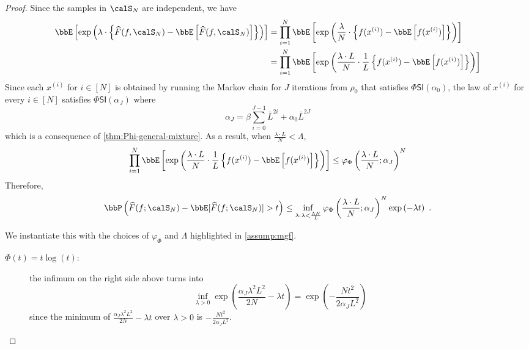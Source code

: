 \documentclass[11pt]{article}
\newcommand{\PhiSI}[1]{\Phi\mathsf{SI}\left(#1\right)}
\begin{document}
\begin{proof}
Since the samples in \(\calS_{N}\) are independent, we have
\begin{align*}
    \bbE\left[\exp\left(\lambda \cdot \left\{\widehat{F}(f, \calS_{N}) - \bbE\left[\widehat{F}(f, \calS_{N})\right]\right\}\right)\right] &= \prod_{i=1}^{N} \bbE\left[\exp\left(\frac{\lambda}{N} \cdot \left\{ f(x^{(i)}) - \bbE\left[f(x^{(i)})\right]\right\}\right)\right] \\
    &= \prod_{i=1}^{N} \bbE\left[\exp\left(\frac{\lambda \cdot L}{N} \cdot \frac{1}{L}\left\{ f(x^{(i)}) - \bbE\left[f(x^{(i)})\right]\right\}\right)\right]
\end{align*}
Since each \(x^{(i)}\) for \(i \in [N]\) is obtained by running the Markov chain for \(J\) iterations from \(\rho_{0}\) that satisfies \(\PhiSI{\alpha_{0}}\), the law of \(x^{(i)}\) for every \(i \in [N]\) satisfies \(\PhiSI{\alpha_{J}}\)
where
\begin{equation*}
    \alpha_{J} = \beta \sum_{i=0}^{J - 1} \bar{L}^{2i} + \alpha_{0} \bar{L}^{2J}
\end{equation*}
which is a consequence of \cref{thm:Phi-general-mixture}.
As a result, when \(\frac{\lambda \cdot L}{N} < \Lambda\),
\begin{equation*}
    \prod_{i=1}^{N} \bbE\left[\exp\left(\frac{\lambda \cdot L}{N} \cdot \frac{1}{L}\left\{ f(x^{(i)}) - \bbE\left[f(x^{(i)})\right]\right\}\right)\right] \leq \varphi_{\Phi}\left(\frac{\lambda \cdot L}{N}; \alpha_{J}\right)^{N}
\end{equation*}
Therefore,
\begin{equation*}
    \bbP\left(\widehat{F}(f; \calS_{N}) - \bbE[\widehat{F}(f; \calS_{N})] > t\right) \leq \inf_{\lambda : \lambda < \frac{\Lambda N}{L}} \varphi_{\Phi}\left(\frac{\lambda \cdot L}{N}; \alpha_{J}\right)^{N} \exp\left(-\lambda t\right)~.
\end{equation*}

We instantiate this with the choices of \(\varphi_{\Phi}\) and \(\Lambda\) highlighted in \cref{assump:mgf}.
\begin{description}
\item [\(\Phi(t) = t\log(t)\): ] the infimum on the right side above turns into
\begin{equation*}
    \inf_{\lambda > 0} \exp\left(\frac{\alpha_{J}\lambda^{2}L^{2}}{2N} - \lambda t\right) = \exp\left(-\frac{Nt^{2}}{2\alpha_{J}L^{2}}\right)
\end{equation*}
since the minimum of \(\frac{\alpha_{J}\lambda^{2}L^{2}}{2N} - \lambda t\) over \(\lambda > 0\) is \(-\frac{Nt^{2}}{2\alpha_{J}L^{2}}\).


\end{description}
\end{proof}
\end{document}
